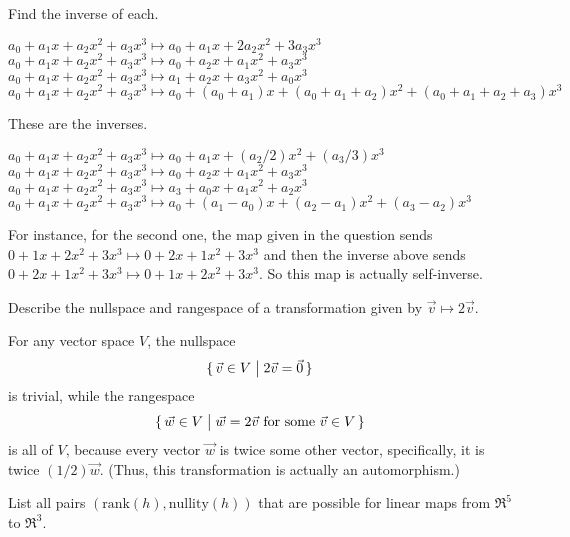 \begin{exercises}
    Find the inverse of each.
    \begin{exparts}
      \partsitem \( a_0+a_1x+a_2x^2+a_3x^3\mapsto a_0+a_1x+2a_2x^2+3a_3x^3 \)
      \partsitem \( a_0+a_1x+a_2x^2+a_3x^3\mapsto a_0+a_2x+a_1x^2+a_3x^3 \)
      \partsitem \( a_0+a_1x+a_2x^2+a_3x^3\mapsto a_1+a_2x+a_3x^2+a_0x^3 \)
      \partsitem \( a_0+a_1x+a_2x^2+a_3x^3\mapsto
              a_0+(a_0+a_1)x+(a_0+a_1+a_2)x^2+(a_0+a_1+a_2+a_3)x^3 \)
    \end{exparts}
    \begin{answer}
      These are the inverses.
      \begin{exparts}
        \partsitem \( a_0+a_1x+a_2x^2+a_3x^3\mapsto
                        a_0+a_1x+(a_2/2)x^2+(a_3/3)x^3 \)
        \partsitem \( a_0+a_1x+a_2x^2+a_3x^3\mapsto a_0+a_2x+a_1x^2+a_3x^3 \)
        \partsitem \( a_0+a_1x+a_2x^2+a_3x^3\mapsto a_3+a_0x+a_1x^2+a_2x^3 \)
        \partsitem \( a_0+a_1x+a_2x^2+a_3x^3\mapsto
                        a_0+(a_1-a_0)x+(a_2-a_1)x^2+(a_3-a_2)x^3 \)
      \end{exparts} 
      For instance, for the second one, the map given in the question sends
      $0+1x+2x^2+3x^3\mapsto 0+2x+1x^2+3x^3$ and then the inverse above
      sends $0+2x+1x^2+3x^3\mapsto 0+1x+2x^2+3x^3$.
      So this map is actually self-inverse.
     \end{answer}
  \item 
    Describe the nullspace and rangespace of a transformation
    given by \( \vec{v}\mapsto 2\vec{v} \).
    \begin{answer}
       For any vector space $V$, the nullspace 
       \begin{equation*}
         \mbox{$\{\,\vec{v}\in V\bigm| 2\vec{v}=\vec{0}\,\}$}
       \end{equation*}
       is trivial, while the rangespace 
       \begin{equation*}
         \mbox{$\{\,\vec{w}\in V\bigm| 
                 \text{$\vec{w}=2\vec{v}$ for some $\vec{v}\in V$}\,\}$}
       \end{equation*}
       is all of \( V \), because every vector $\vec{w}$ is twice some 
       other vector, specifically, it is twice $(1/2)\vec{w}$.
       (Thus, this transformation is actually an automorphism.)  
    \end{answer}
  \item 
    List all pairs \( (\text{rank}(h),\text{nullity}(h)) \) 
    that are possible for linear maps from $\Re^5$ to $\Re^3$.
    \begin{answer}

\end{answer}
\end{exercises}
